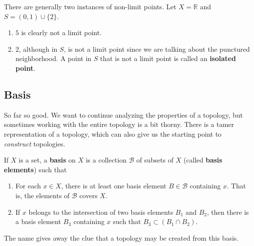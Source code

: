     \begin{example}
      There are generally two instances of non-limit points. Let $X = \mathbb{R}$ and $S = (0, 1) \cup \{2\}$. 
      \begin{enumerate}
        \item $5$ is clearly not a limit point. 
        \item $2$, although in $S$, is not a limit point since we are talking about the punctured neighborhood. A point in $S$ that is not a limit point is called an \textbf{isolated point}. 
      \end{enumerate}
    \end{example}

  \subsection{Basis} 

    So far so good. We want to continue analyzing the properties of a topology, but sometimes working with the entire topology is a bit thorny. There is a tamer representation of a topology, which can also give us the starting point to \textit{construct} topologies. 

    \begin{definition}[Basis]
      If $X$ is a set, a \textbf{basis} on $X$ is a collection $\mathscr{B}$ of subsets of $X$ (called \textbf{basis elements}) such that
      \begin{enumerate}
        \item For each $x \in X$, there is at least one basis element $B \in \mathscr{B}$ containing $x$. That is, the elements of $\mathscr{B}$ covers $X$. 
        \item If $x$ belongs to the intersection of two basis elements $B_1$ and $B_2$, then there is a basis element $B_3$ containing $x$ such that $B_3 \subset (B_1 \cap B_2)$. 
      \end{enumerate}
    \end{definition} 

    The name gives away the clue that a topology may be created from this basis.  

